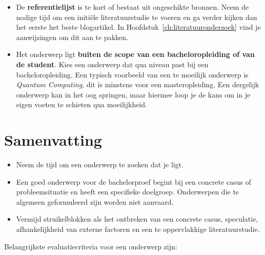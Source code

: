 \begin{itemize}
  \item De \textbf{referentielijst} is te kort of bestaat uit ongeschikte bronnen. Neem de nodige tijd om een initiële literatuurstudie te voeren en ga verder kijken dan het eerste het beste blogartikel. In Hoofdstuk~\ref{ch:literatuuronderzoek} vind je aanwijzingen om dit aan te pakken.

  \item Het onderwerp ligt \textbf{buiten de scope van een bacheloropleiding of van de student}. Kies een onderwerp dat qua niveau past bij een bacheloropleiding. Een typisch voorbeeld van een te moeilijk onderwerp is \textit{Quantum Computing}, dit is minstens voor een masteropleiding. Een dergelijk onderwerp kan in het oog springen, maar hiermee loop je de kans om in je eigen voeten te schieten qua moeilijkheid.
\end{itemize}

\section{Samenvatting}%
\label{sec:onderwerp_samenvatting}

\begin{itemize}
  \item Neem de tijd om een onderwerp te zoeken dat je ligt.
  \item Een goed onderwerp voor de bachelorproef begint bij een concrete casus of probleemsituatie en heeft een specifieke doelgroep. Onderwerpen die te algemeen geformuleerd zijn worden niet aanvaard.
  \item Vermijd struikelblokken als het ontbreken van een concrete casus, speculatie, afhankelijkheid van externe factoren en een te oppervlakkige literatuurstudie.
\end{itemize}

Belangrijkste evaluatiecriteria voor een onderwerp zijn:

